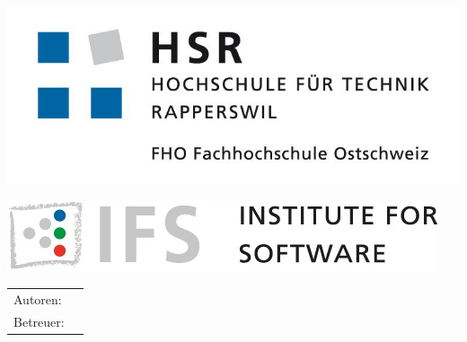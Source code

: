 

\begin{titlepage}

\begin{center}
\begin{minipage}[t]{0.45\textwidth}
    \includegraphics[width=\textwidth]{start/img/hsrLogo}
\end{minipage}
\hspace{\fill} %
\begin{minipage}[t]{0.45\textwidth}
    \vspace{-2.56cm}
    \includegraphics[width=\textwidth]{start/img/ifsLogo}
\end{minipage}

\end{center}

\vspace{15ex} %
\Huge 
\textbf{\titel}

\vspace{3ex}
\textbf{\work}

\vspace{1ex}
\LARGE 
\place

\vspace{5ex}
\timeperiod

\vspace{11ex}
\begin{tabular}{ll} %
	Autoren:        & \authors    \\
	Betreuer:        & \advisor    \\
\end{tabular}

\end{titlepage}

\restoregeometry %
